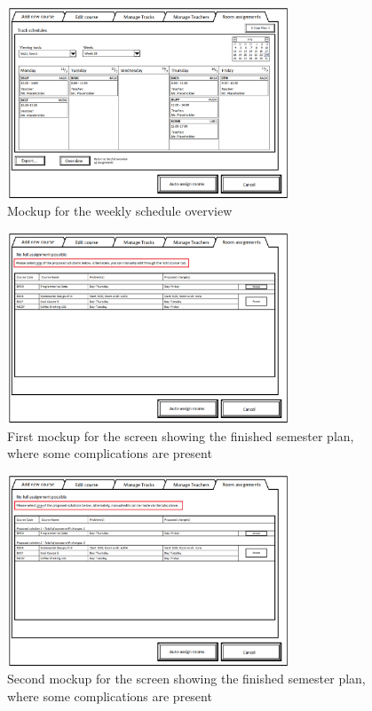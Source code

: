 \begin{figure}
\begin{center}
\leavevmode
\includegraphics[width=0.75\textwidth]{images/courseplan2_Room_Assignments_schedules}
\end{center}
\caption{Mockup for the weekly schedule overview}
\label{fig:app2_mock2_6}
\end{figure}

\begin{figure}
\begin{center}
\leavevmode
\includegraphics[width=0.75\textwidth]{images/courseplan_Room_Assignments_clash}
\end{center}
\caption{First mockup for the screen showing the finished semester plan, where some complications are present}
\label{fig:app2_mock1_7}
\end{figure}

\begin{figure}
\begin{center}
\leavevmode
\includegraphics[width=0.75\textwidth]{images/courseplan2_Room_Assignments_clash}
\end{center}
\caption{Second mockup for the screen showing the finished semester plan, where some complications are present}
\label{fig:app2_mock2_7}
\end{figure}

\clearpage